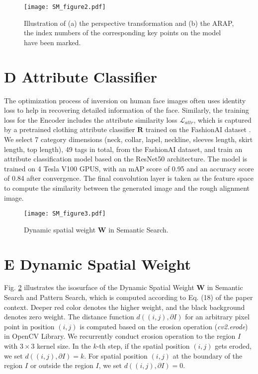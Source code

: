 \documentclass[10pt,twocolumn,letterpaper]{article}
\begin{document}
\begin{figure}[h]
  \centering
  \texttt{[image: SM\_figure2.pdf]}
  \caption{Illustration of (a) the perspective transformation and (b) the ARAP, the index numbers of the corresponding key points on the model have been marked.}\label{fig: SM_rough_alignment}
\end{figure}


\section*{D Attribute Classifier}
The optimization process of inversion on human face images often uses identity loss to help in recovering detailed information of the face. Similarly, the training loss for the Encoder includes the attribute similarity loss $\mathcal{L}_{attr}$, which is captured by a pretrained clothing attribute classifier $\bm{R}$ trained on the FashionAI dataset \cite{zou2019fashionai}. We select 7 category dimensions (neck, collar, lapel, neckline, sleeves length, skirt length, top length), 49 tags in total, from the FashionAI dataset, and train an attribute classification model based on the ResNet50 architecture. The model is trained on 4 Tesla V100 GPUS, with an mAP score of 0.95 and an accuracy score of 0.84 after convergence. 
The final convolution layer is taken as the feature space to compute the similarity between the generated image and the rough alignment image.


\begin{figure}[h]
  \centering
  \texttt{[image: SM\_figure3.pdf]}
  \caption{Dynamic spatial weight $\bm{W}$ in Semantic Search.}\label{fig: dynamic_W}
\end{figure}

\section*{E Dynamic Spatial Weight}
Fig. \ref{fig: dynamic_W} illustrates the isosurface of the Dynamic Spatial Weight $\bm{W}$ in Semantic Search and Pattern Search, which is computed according to Eq. (18) of the paper context. Deeper red color denotes the higher weight, and the black background denotes zero weight. 
The distance function $d((i,j),\partial I)$ for an arbitrary pixel point in position $(i,j)$ is computed based on the erosion operation (\textit{cv2.erode}) in OpenCV Library. We recurrently conduct erosion operation to the region $I$ with $3\times3$ kernel size. In the $k$-th step, if the spatial position $(i,j)$ gets eroded, we set $d((i,j),\partial I)=k$. For spatial position $(i,j)$ at the boundary of the region $I$ or outside the region $I$, we set $d((i,j),\partial I)=0$.
\end{document}
